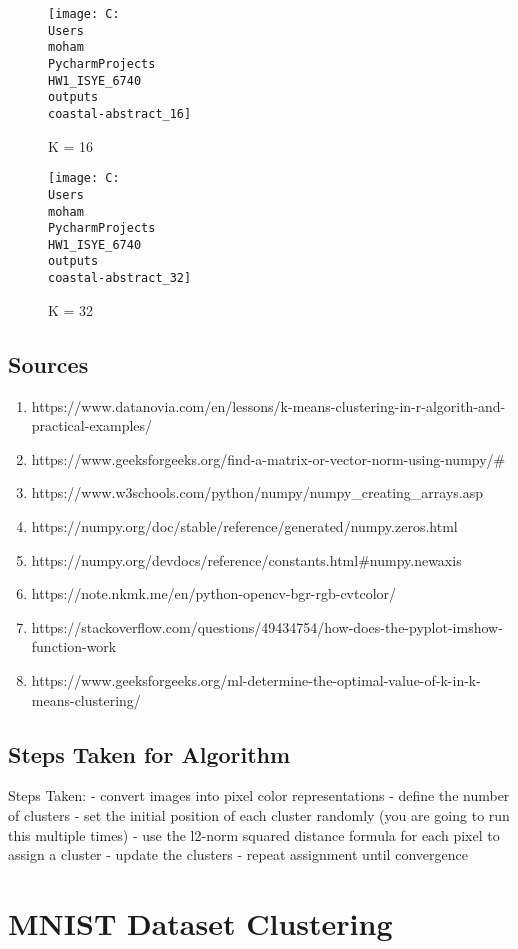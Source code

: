 \documentclass[twoside,10pt]{article}
\begin{document}
\begin{figure}
    \centering
    \texttt{[image: C:\\Users\\moham\\PycharmProjects\\HW1\_ISYE\_6740\\outputs\\coastal-abstract\_16]}
    \caption{K = 16}
    \label{fig:coastal-abstract_16}
\end{figure}

\begin{figure}
    \centering
    \texttt{[image: C:\\Users\\moham\\PycharmProjects\\HW1\_ISYE\_6740\\outputs\\coastal-abstract\_32]}
    \caption{K = 32}
    \label{fig:coastal-abstract_32}
\end{figure}

\subsection{Sources}

\begin{enumerate}
\item https://www.datanovia.com/en/lessons/k-means-clustering-in-r-algorith-and-practical-examples/
\item https://www.geeksforgeeks.org/find-a-matrix-or-vector-norm-using-numpy/#
\item https://www.w3schools.com/python/numpy/numpy_creating_arrays.asp
\item https://numpy.org/doc/stable/reference/generated/numpy.zeros.html
\item https://numpy.org/devdocs/reference/constants.html#numpy.newaxis
\item https://note.nkmk.me/en/python-opencv-bgr-rgb-cvtcolor/
\item https://stackoverflow.com/questions/49434754/how-does-the-pyplot-imshow-function-work
\item https://www.geeksforgeeks.org/ml-determine-the-optimal-value-of-k-in-k-means-clustering/

\end{enumerate}

\subsection{Steps Taken for Algorithm}
Steps Taken:
- convert images into pixel color representations
- define the number of clusters
- set the initial position of each cluster randomly (you are going to run this multiple times)
- use the l2-norm squared distance formula for each pixel to assign a cluster
- update the clusters
- repeat assignment until convergence

\section{MNIST Dataset Clustering}
\end{document}
